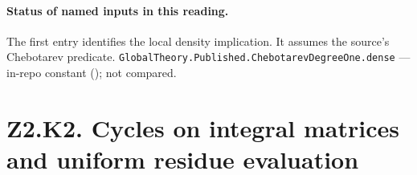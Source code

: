 
\paragraph{Status of named inputs in this reading.}
The first entry identifies the local density implication. It assumes the source’s Chebotarev predicate.
\noindent\nolinkurl{GlobalTheory.Published.ChebotarevDegreeOne.dense} --- in-repo constant (); not compared.\par

\section*{Z2.K2. Cycles on integral matrices and uniform residue evaluation}

